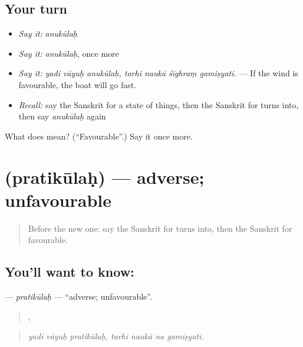 \subsection*{Your turn}
\begin{itemize}
\raggedright
  \item \emph{Say it:} \emph{anukūlaḥ}
  \item \emph{Say it:} \emph{anukūlaḥ}, once more
  \item \emph{Say it:} \emph{yadi vāyuḥ anukūlaḥ, tarhi naukā śīghraṃ gamiṣyati.} — If the wind is favourable, the boat will go fast.
  \item \emph{Recall:} say the Sanskrit for a state of things, then the Sanskrit for turns into, then say \emph{anukūlaḥ} again
\end{itemize}

\begin{tcolorbox}[breakable,colback=teal!4,colframe=teal!35!black,title={Before you move on}]
What does  mean? (\textquotedblleft{}Favourable\textquotedblright{}.) Say it once more.
\end{tcolorbox}
\section[\texorpdfstring{\sk{प्रतिकूलः} (pratikūlaḥ)}{प्रतिकूलः (pratikūlaḥ)}]{ (pratikūlaḥ) — adverse; unfavourable}

\label{lesson:SA-C370-pratikulah}



\begin{quote}
Before the new one: say the Sanskrit for turns into, then the Sanskrit for favourable.
\end{quote}

\subsection*{You'll want to know: }
\textbf{} — \emph{pratikūlaḥ} — \textquotedblleft{}adverse; unfavourable\textquotedblright{}.

\begin{quote}
  ,    
\end{quote}

\begin{quote}
\emph{yadi vāyuḥ pratikūlaḥ, tarhi naukā na gamiṣyati.}
\end{quote}

